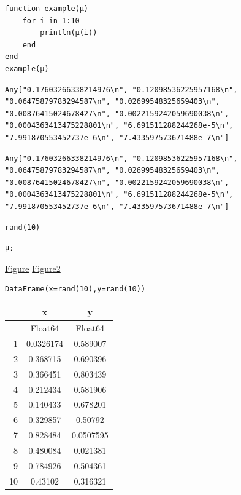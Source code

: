 \begin{lstlisting}[language=JuliaLocal, style=julia]
function example(μ)
    for i in 1:10
        println(μ(i))
    end
end
example(μ)
\end{lstlisting}

\begin{verbatim}
Any["0.17603266338214976\n", "0.12098536225957168\n", "0.06475879783294587\n", "0.02699548325659403\n", "0.00876415024678427\n", "0.0022159242059690038\n", "0.0004363413475228801\n", "6.691511288244268e-5\n", "7.991870553452737e-6\n", "7.433597573671488e-7\n"]
\end{verbatim}

\begin{verbatim}
Any["0.17603266338214976\n", "0.12098536225957168\n", "0.06475879783294587\n", "0.02699548325659403\n", "0.00876415024678427\n", "0.0022159242059690038\n", "0.0004363413475228801\n", "6.691511288244268e-5\n", "7.991870553452737e-6\n", "7.433597573671488e-7\n"]
\end{verbatim}

\begin{lstlisting}[language=JuliaLocal, style=julia]
rand(10)
\end{lstlisting}

\begin{lstlisting}[language=JuliaLocal, style=julia]
μ;
\end{lstlisting}
\href{figure.svg}{Figure}  \href{plotexample.png}{Figure2}
\begin{lstlisting}[language=JuliaLocal, style=julia]
DataFrame(x=rand(10),y=rand(10))
\end{lstlisting}

\begin{tabular}{r|cc}
	   & x         & y         \\
	\hline
	   & Float64   & Float64   \\
	\hline
	1  & 0.0326174 & 0.589007  \\
	2  & 0.368715  & 0.690396  \\
	3  & 0.366451  & 0.803439  \\
	4  & 0.212434  & 0.581906  \\
	5  & 0.140433  & 0.678201  \\
	6  & 0.329857  & 0.50792   \\
	7  & 0.828484  & 0.0507595 \\
	8  & 0.480084  & 0.021381  \\
	9  & 0.784926  & 0.504361  \\
	10 & 0.43102   & 0.316321  \\
\end{tabular}

\begin{lstlisting}[language=JuliaLocal, style=julia]

\end{lstlisting}
